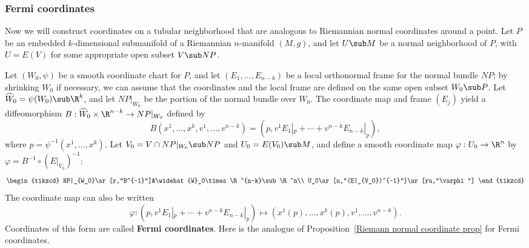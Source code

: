\subsubsection{Fermi coordinates}
Now we will construct coordinates on a tubular neighborhood that are analogous to Riemannian normal coordinates around a point. Let $P$ be an embedded $k$-dimensional 
submanifold of a Riemannian $n$-manifold $(M,g)$, and let $U\sub M$ be a normal neighborhood of $P$, with $U=E(V)$ for some appropriate open subset $V\sub NP$.\par
Let $(W_0,\psi)$ be a smooth coordinate chart for $P$, and let $(E_1,\dots,E_{n-k})$ be a local orthonormal frame for the normal bundle $NP$; by shrinking $W_0$ if necessary, we can assume that the coordinates and the local frame are defined on the same open subset $W_0\sub P$. Let $\widehat{W}_0=\psi(W_0)\sub\R^k$, and let $NP|_{W_0}$ be the portion of the normal bundle over $W_0$. The coordinate map and frame $(E_j)$ yield a diffeomorphism $B:\widehat{W}_0\times\R^{n-k}\to NP|_{W_0}$ 
defined by
\[B(x^1,\dots,x^k,v^1,\dots,v^{n-k})=(p,v^1E_1|_p+\cdots+v^{n-k}E_{n-k}|_p),\]
where $p=\psi^{-1}(x^1,\dots,x^k)$. Let $V_0=V\cap NP|_{W_0}\sub NP$ and $U_0=E(V_0)\sub M$, and define a smooth coordinate map $\varphi:U_0\to\R^n$ by $\varphi=B^{-1}\circ(E|_{V_0})^{-1}$:
\[\begin{tikzcd}
NP|_{W_0}\ar[r,"B^{-1}"]&\widehat{W}_0\times\R^{n-k}\sub\R^n\\
U_0\ar[u,"(E|_{V_0})^{-1}"]\ar[ru,"\varphi"]
\end{tikzcd}\]
The coordinate map can also be written
\[\varphi:(p,v^1E_1|_p+\cdots+v^{n-k}E_{n-k}|_p)\mapsto(x^1(p),\dots,x^k(p),v^1,\dots,v^{n-k}).\]
Coordinates of this form are called \textbf{Fermi coordinates}. Here is the analogue of Proposition~\ref{Riemann normal coordinate prop} for Fermi coordinates.
